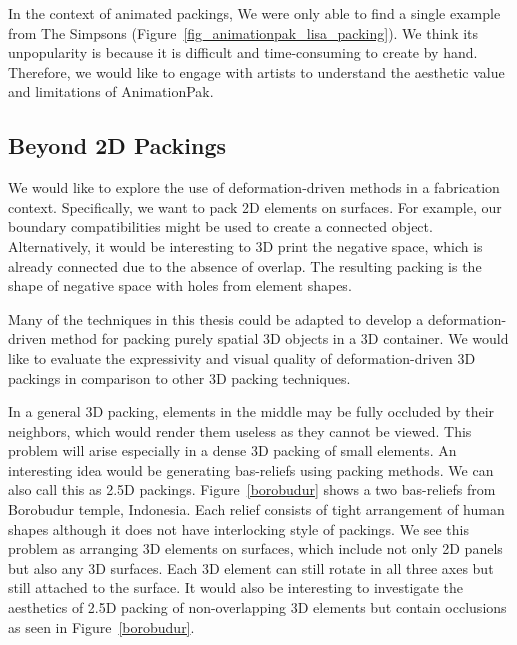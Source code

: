 In the context of animated packings, 
We were only able to find a single example from The Simpsons (Figure~\ref{fig_animationpak_lisa_packing}). 
We think its unpopularity is because it is difficult and time-consuming to create by hand.
Therefore, we would like to engage with artists to understand the aesthetic value and limitations
of AnimationPak.


\subsection{Beyond 2D Packings}

We would like to explore the use of deformation-driven methods in a fabrication context.
Specifically, we want to pack 2D elements on surfaces.
For example, our boundary compatibilities might be used to create a connected object.
Alternatively, it would be interesting to 3D print the 
negative space, which is already connected due to the absence of overlap.
The resulting packing is the shape of negative space with holes from element shapes.

Many of the techniques in this thesis could be adapted
to develop a deformation-driven method for packing purely spatial
3D objects in a 3D container.  
We would like to evaluate the
expressivity and visual quality of deformation-driven 3D packings 
in comparison to other 3D packing techniques.

In a general 3D packing, elements in the middle may be fully occluded by their neighbors,
which would render them useless as they cannot be viewed.
This problem will arise especially in a dense 3D packing of small elements.
An interesting idea would be generating bas-reliefs using packing methods.
We can also call this as 2.5D packings.
Figure~\ref{borobudur} shows a two bas-reliefs from Borobudur temple, Indonesia.
Each relief consists of tight arrangement of human shapes although it does not 
have interlocking style of packings.
We see this problem as arranging 3D elements on surfaces, 
which include not only 2D panels but also any 3D surfaces.
Each 3D element can still rotate in all three axes but still attached to the surface.
It would also be interesting to investigate the aesthetics of 2.5D packing of non-overlapping
3D elements but contain occlusions as seen in Figure~\ref{borobudur}.


